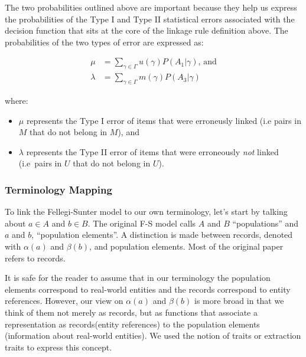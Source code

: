 \documentclass[lettersize,journal]{IEEEtran}
\begin{document}
    The two probabilities outlined above are important because they help us
    express the probabilities of the Type I and Type II statistical errors
    associated with the decision function that sits at the core of the linkage
    rule definition above.
    The probabilities of the two types of error are expressed as:

    \begin{align}
        \mu&=\sum_{\gamma \in \varGamma}u(\gamma)P(A_1|\gamma)\textrm{,~and}\nonumber\\
        \lambda&=\sum_{\gamma \in \varGamma}m(\gamma)P(A_3|\gamma)\nonumber
    \end{align}

    where:

    \begin{itemize}
        \item $\mu$ represents the Type I error of items that were erroneusly
        linked (i.e pairs in $M$ that do not belong in $M$), and
        \item $\lambda$ represents the Type II error of items that were
        erroneously \textit{not} linked (i.e~pairs in $U$ that do not belong in
        $U$).
    \end{itemize}

    \subsubsection[fms-term]{Terminology Mapping}\label{subsubsec:fsm-term}

    To link the Fellegi-Sunter model to our own terminology, let's start by
    talking about $a \in A$ and $b \in B$.
    The original F-S model calls $A$ and $B$ ``populations'' and $a$ and $b$,
    ``population elements''.
    A distinction is made between records, denoted with $\alpha(a)$ and
    $\beta(b)$, and population elements.
    Most of the original paper refers to records.

    It is safe for the reader to assume that in our terminology the population
    elements correspond to real-world entities and the records correspond to
    entity references.
    However, our view on $\alpha(a)$ and $\beta(b)$ is more broad in that we
    think of them not merely as records, but as functions that associate a
    representation as records(entity references) to the population elements
    (information about real-world entities).
    We used the notion of traits or extraction traits to express this concept.
        
\end{document}
